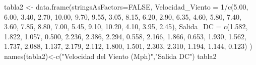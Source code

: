 \documentclass[
]{article}
\newenvironment{Shaded}{\begin{snugshade}}{\end{snugshade}}
\newcommand{\AttributeTok}[1]{\textcolor[rgb]{0.77,0.63,0.00}{#1}}
\newcommand{\ConstantTok}[1]{\textcolor[rgb]{0.00,0.00,0.00}{#1}}
\newcommand{\DecValTok}[1]{\textcolor[rgb]{0.00,0.00,0.81}{#1}}
\newcommand{\FloatTok}[1]{\textcolor[rgb]{0.00,0.00,0.81}{#1}}
\newcommand{\FunctionTok}[1]{\textcolor[rgb]{0.00,0.00,0.00}{#1}}
\newcommand{\NormalTok}[1]{#1}
\newcommand{\OtherTok}[1]{\textcolor[rgb]{0.56,0.35,0.01}{#1}}
\newcommand{\SpecialCharTok}[1]{\textcolor[rgb]{0.00,0.00,0.00}{#1}}
\newcommand{\StringTok}[1]{\textcolor[rgb]{0.31,0.60,0.02}{#1}}
\begin{document}
\begin{Shaded}
\begin{Highlighting}[]
\NormalTok{tabla2 }\OtherTok{\textless{}{-}} \FunctionTok{data.frame}\NormalTok{(}\AttributeTok{stringsAsFactors=}\ConstantTok{FALSE}\NormalTok{,}
\AttributeTok{Velocidad\_Viento =} \DecValTok{1}\SpecialCharTok{/}\FunctionTok{c}\NormalTok{(}\FloatTok{5.00}\NormalTok{, }\FloatTok{6.00}\NormalTok{, }\FloatTok{3.40}\NormalTok{, }\FloatTok{2.70}\NormalTok{,}
      \FloatTok{10.00}\NormalTok{, }\FloatTok{9.70}\NormalTok{, }\FloatTok{9.55}\NormalTok{, }\FloatTok{3.05}\NormalTok{, }\FloatTok{8.15}\NormalTok{, }\FloatTok{6.20}\NormalTok{, }\FloatTok{2.90}\NormalTok{, }\FloatTok{6.35}\NormalTok{, }\FloatTok{4.60}\NormalTok{, }\FloatTok{5.80}\NormalTok{, }\FloatTok{7.40}\NormalTok{, }\FloatTok{3.60}\NormalTok{,}
      \FloatTok{7.85}\NormalTok{, }\FloatTok{8.80}\NormalTok{, }\FloatTok{7.00}\NormalTok{, }\FloatTok{5.45}\NormalTok{, }\FloatTok{9.10}\NormalTok{, }\FloatTok{10.20}\NormalTok{, }\FloatTok{4.10}\NormalTok{, }\FloatTok{3.95}\NormalTok{, }\FloatTok{2.45}\NormalTok{),}
\AttributeTok{Salida\_DC =} \FunctionTok{c}\NormalTok{(}\FloatTok{1.582}\NormalTok{, }\FloatTok{1.822}\NormalTok{, }\FloatTok{1.057}\NormalTok{, }\FloatTok{0.500}\NormalTok{, }\FloatTok{2.236}\NormalTok{, }\FloatTok{2.386}\NormalTok{, }\FloatTok{2.294}\NormalTok{, }\FloatTok{0.558}\NormalTok{, }\FloatTok{2.166}\NormalTok{, }\FloatTok{1.866}\NormalTok{,}
     \FloatTok{0.653}\NormalTok{, }\FloatTok{1.930}\NormalTok{, }\FloatTok{1.562}\NormalTok{, }\FloatTok{1.737}\NormalTok{, }\FloatTok{2.088}\NormalTok{, }\FloatTok{1.137}\NormalTok{, }\FloatTok{2.179}\NormalTok{, }\FloatTok{2.112}\NormalTok{, }\FloatTok{1.800}\NormalTok{, }\FloatTok{1.501}\NormalTok{, }\FloatTok{2.303}\NormalTok{,}
     \FloatTok{2.310}\NormalTok{, }\FloatTok{1.194}\NormalTok{, }\FloatTok{1.144}\NormalTok{, }\FloatTok{0.123}\NormalTok{)}
\NormalTok{)}
\FunctionTok{names}\NormalTok{(tabla2)}\OtherTok{\textless{}{-}}\FunctionTok{c}\NormalTok{(}\StringTok{"Velocidad del Viento (Mph)"}\NormalTok{,}\StringTok{"Salida DC"}\NormalTok{)}
\NormalTok{tabla2}
\end{Highlighting}
\end{Shaded}
\end{document}
